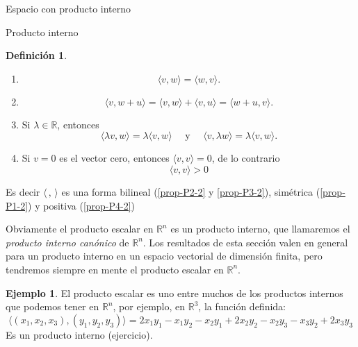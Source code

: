\documentclass[a4paper,12pt,twoside,spanish,reqno]{amsbook}
\theoremstyle{definition}
\newtheorem{definicion}{Definici\'on}[section]
\newtheorem{ejemplo}{Ejemplo}[section]
\theoremstyle{remark}
\newcommand{\la}{\langle}
\newcommand{\ra}{\rangle}
\newcommand{\R}{\mathbb R}
\begin{document}
\begin{chapter}{Espacio con producto interno}
\begin{section}{Producto interno}
\begin{definicion}
            \begin{enumerate}[label=\textbf{P\arabic*.},ref=P\arabic*]
                \item\label{prop-P1-2}
                \begin{equation*}
                    \langle v , w \rangle = \langle w , v \rangle.
                \end{equation*} 	
                \item\label{prop-P2-2} 
                \begin{equation*}
                \langle v , w + u \rangle =\langle v , w \rangle + \langle v , u \rangle = \langle w +u , v \rangle.
                \end{equation*}
                \item\label{prop-P3-2}  Si $\lambda \in \R$, entonces 
                \begin{equation*}
                \langle \lambda v , w \rangle = \lambda \langle v , w \rangle \quad \text{ y } \quad  \langle v , \lambda w \rangle = \lambda \langle v , w \rangle.
                \end{equation*}
                \item\label{prop-P4-2} Si $v=0$ es el vector cero, entonces $\langle v , v \rangle =0$,  de lo contrario
                \begin{equation*}
                \langle v , v \rangle >0
                \end{equation*}
            \end{enumerate}
            Es decir  $\la \,,\,\ra$ es una forma bilineal (\ref{prop-P2-2} y \ref{prop-P3-2}),  simétrica (\ref{prop-P1-2}) y positiva (\ref{prop-P4-2})
        \end{definicion}
    
        
        Obviamente el producto escalar en $\R^n$  es un producto interno,  que llamaremos  el  \textit{producto interno canónico} de $\R^n$. Los resultados de esta sección valen en general para un producto interno en un espacio vectorial de dimensión finita, pero tendremos siempre en mente el producto escalar en $\R^n$. 

            \begin{ejemplo} El producto escalar es uno entre  muchos de los productos internos que podemos tener en $\R^n$, por ejemplo,  en $\R^3$,  la función definida:
                \begin{equation*}
                    \langle (x_1,x_2,x_3) , (y_1,y_2,y_3)\rangle =2x_1y_1-x_1y_2-x_2y_1+2x_2y_2-x_2y_3-x_3y_2+2x_3y_3
                \end{equation*}
                Es un producto interno (ejercicio).
            \end{ejemplo}
        

\end{section}
\end{chapter}
\end{document}
